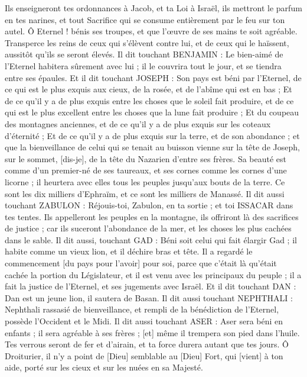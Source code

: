 \begin{multicols}{2}
Ils enseigneront tes ordonnances à Jacob, et ta Loi à Israël, ils mettront le parfum en tes narines, et tout Sacrifice qui se consume entièrement par le feu sur ton autel.
Ô Eternel ! bénis ses troupes, et que l'œuvre de ses mains te soit agréable. Transperce les reins de ceux qui s'élèvent contre lui, et de ceux qui le haïssent, aussitôt qu'ils se seront élevés.
Il dit touchant BENJAMIN : Le bien-aimé de l'Eternel habitera sûrement avec lui ; il le couvrira tout le jour, et se tiendra entre ses épaules.
Et il dit touchant JOSEPH : Son pays est béni par l'Eternel, de ce qui est le plus exquis aux cieux, de la rosée, et de l'abîme qui est en bas ;
Et de ce qu'il y a de plus exquis entre les choses que le soleil fait produire, et de ce qui est le plus excellent entre les choses que la lune fait produire ;
Et du coupeau des montagnes anciennes, et de ce qu'il y a de plus exquis sur les coteaux d'éternité ;
Et de ce qu'il y a de plus exquis sur la terre, et de son abondance ; et que la bienveillance de celui qui se tenait au buisson vienne sur la tête de Joseph, sur le sommet, [dis-je], de la tête du Nazarien d'entre ses frères.
Sa beauté est comme d'un premier-né de ses taureaux, et ses cornes comme les cornes d'une licorne ; il heurtera avec elles tous les peuples jusqu'aux bouts de la terre. Ce sont les dix milliers d'Ephraïm, et ce sont les milliers de Manassé.
Il dit aussi touchant ZABULON : Réjouis-toi, Zabulon, en ta sortie ; et toi ISSACAR dans tes tentes.
Ils appelleront les peuples en la montagne, ils offriront là des sacrifices de justice ; car ils suceront l'abondance de la mer, et les choses les plus cachées dans le sable.
Il dit aussi, touchant GAD : Béni soit celui qui fait élargir Gad ; il habite comme un vieux lion, et il déchire bras et tête.
Il a regardé le commencement [du pays pour l'avoir] pour soi, parce que c'était là qu'était cachée la portion du Législateur, et il est venu avec les principaux du peuple ; il a fait la justice de l'Eternel, et ses jugements avec Israël.
Et il dit touchant DAN : Dan est un jeune lion, il sautera de Basan.
Il dit aussi touchant NEPHTHALI : Nephthali rassasié de bienveillance, et rempli de la bénédiction de l'Eternel, possède l'Occident et le Midi.
Il dit aussi touchant ASER : Aser sera béni en enfants ; il sera agréable à ses frères ; [et] même il trempera son pied dans l'huile.
Tes verrous seront de fer et d'airain, et ta force durera autant que tes jours.
Ô Droiturier, il n'y a point de [Dieu] semblable au [Dieu] Fort, qui [vient] à ton aide, porté sur les cieux et sur les nuées en sa Majesté.

\end{multicols}
